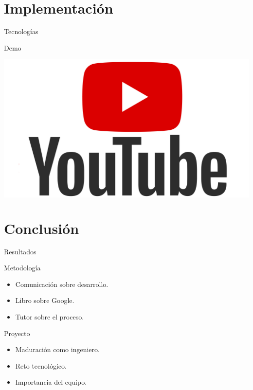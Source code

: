 \documentclass[12pt]{beamer}
\begin{document}
	\section{Implementación}
		\begin{frame}{Tecnologías}
			\begin{center}
			\end{center}
		\end{frame}

		\begin{frame}{Demo}
			\begin{center}
				\includegraphics[width=\textwidth,height=0.5\textheight,keepaspectratio]{img/architecture/youtube}
			\end{center}
			\begin{center}
				\href{https://bit.ly/2ZqCkrJ}{}
			\end{center}
		\end{frame}

	\section{Conclusión}
		\begin{frame}{Resultados}
			\begin{block}{Metodología}
				\begin{itemize}
					\item Comunicación sobre desarrollo.
					\item Libro sobre Google.
					\item Tutor sobre el proceso.
				\end{itemize}
			\end{block}
			\begin{block}{Proyecto}
				\begin{itemize}
					\item Maduración como ingeniero.
					\item Reto tecnológico.
					\item Importancia del equipo.
				\end{itemize}
			\end{block}
		\end{frame}
		
\end{document}
